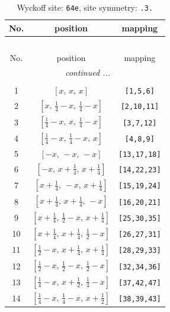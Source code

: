 \documentclass[fleqn,8pt]{jsarticle}
\begin{document}
\begin{longtable}{ccc}
\caption{Wyckoff site: {\tt 64e}, site symmetry: {\tt .3.}}
 \\
 \hline \hline
No. & position & mapping \\ \hline \endfirsthead

\multicolumn{2}{l}{\tablename\ \thetable{}} \\
 \hline \hline
No. & position & mapping \\ \hline \endhead

 \hline \hline
\multicolumn{2}{r}{\footnotesize\it continued ...} \\ \endfoot

 \hline \hline
\multicolumn{2}{r}{} \\ \endlastfoot

1 & $\left[ x,\, x,\, x \right]$ & {\tt [1,5,6]} \\ \hline
2 & $\left[ x,\, \frac{1}{4} - x,\, \frac{1}{4} - x \right]$ & {\tt [2,10,11]} \\ \hline
3 & $\left[ \frac{1}{4} - x,\, x,\, \frac{1}{4} - x \right]$ & {\tt [3,7,12]} \\ \hline
4 & $\left[ \frac{1}{4} - x,\, \frac{1}{4} - x,\, x \right]$ & {\tt [4,8,9]} \\ \hline
5 & $\left[ - x,\, - x,\, - x \right]$ & {\tt [13,17,18]} \\ \hline
6 & $\left[ - x,\, x + \frac{1}{4},\, x + \frac{1}{4} \right]$ & {\tt [14,22,23]} \\ \hline
7 & $\left[ x + \frac{1}{4},\, - x,\, x + \frac{1}{4} \right]$ & {\tt [15,19,24]} \\ \hline
8 & $\left[ x + \frac{1}{4},\, x + \frac{1}{4},\, - x \right]$ & {\tt [16,20,21]} \\ \hline
9 & $\left[ x + \frac{1}{4},\, \frac{1}{2} - x,\, x + \frac{1}{4} \right]$ & {\tt [25,30,35]} \\ \hline
10 & $\left[ x + \frac{1}{4},\, x + \frac{1}{4},\, \frac{1}{2} - x \right]$ & {\tt [26,27,31]} \\ \hline
11 & $\left[ \frac{1}{2} - x,\, x + \frac{1}{4},\, x + \frac{1}{4} \right]$ & {\tt [28,29,33]} \\ \hline
12 & $\left[ \frac{1}{2} - x,\, \frac{1}{2} - x,\, \frac{1}{2} - x \right]$ & {\tt [32,34,36]} \\ \hline
13 & $\left[ \frac{1}{4} - x,\, x + \frac{1}{2},\, \frac{1}{4} - x \right]$ & {\tt [37,42,47]} \\ \hline
14 & $\left[ \frac{1}{4} - x,\, \frac{1}{4} - x,\, x + \frac{1}{2} \right]$ & {\tt [38,39,43]} \\ \hline

\end{longtable}
\end{document}
